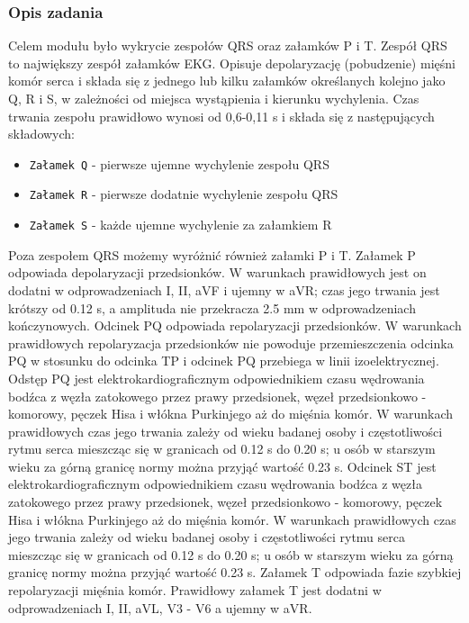 \documentclass[a4paper, 11pt]{article}
\begin{document}
\subsubsection{Opis zadania}
\label{sec:st_interval:desc}
Celem modułu było wykrycie zespołów QRS oraz załamków P i T.
Zespół QRS to największy zespół załamków EKG. Opisuje depolaryzację (pobudzenie) mięśni komór serca i składa się z jednego lub kilku załamków określanych kolejno jako Q, R i S, w zależności od miejsca wystąpienia i kierunku wychylenia. Czas trwania zespołu prawidłowo wynosi od 0,6-0,11 s i składa się z następujących składowych:
\begin{itemize}
     \item \verb|Załamek Q| - pierwsze ujemne wychylenie zespołu QRS
     \item \verb|Załamek R| - pierwsze dodatnie wychylenie zespołu QRS
     \item \verb|Załamek S| - każde ujemne wychylenie za załamkiem R
\end{itemize}

Poza zespołem QRS możemy wyróżnić również załamki P i T.
Załamek P odpowiada depolaryzacji przedsionków. W warunkach prawidłowych jest on dodatni w odprowadzeniach I, II, aVF i ujemny w aVR; czas jego trwania jest krótszy od 0.12 s, a amplituda nie przekracza 2.5 mm w odprowadzeniach kończynowych.
Odcinek PQ odpowiada repolaryzacji przedsionków. W warunkach prawidłowych repolaryzacja przedsionków nie powoduje przemieszczenia odcinka PQ w stosunku do odcinka TP i odcinek PQ przebiega w linii izoelektrycznej.
Odstęp PQ jest elektrokardiograficznym odpowiednikiem czasu wędrowania bodźca z węzła zatokowego
przez prawy przedsionek, węzeł przedsionkowo - komorowy, pęczek Hisa i włókna Purkinjego aż do mięśnia komór. W warunkach prawidłowych czas jego trwania zależy od wieku badanej osoby i częstotliwości rytmu serca mieszcząc się w granicach od 0.12 s do 0.20 s; u osób w starszym wieku za górną granicę normy można przyjąć wartość 0.23 s.
Odcinek ST jest elektrokardiograficznym odpowiednikiem czasu wędrowania bodźca z węzła zatokowego przez prawy przedsionek, węzeł przedsionkowo - komorowy, pęczek Hisa i włókna Purkinjego aż do mięśnia komór. W warunkach prawidłowych czas jego trwania zależy od wieku badanej osoby i częstotliwości rytmu serca mieszcząc się w granicach od 0.12 s do 0.20 s; u osób w starszym wieku za górną granicę normy można przyjąć wartość 0.23 s.
Załamek T odpowiada fazie szybkiej repolaryzacji mięśnia komór. Prawidłowy załamek T jest dodatni w odprowadzeniach I, II, aVL, V3 - V6 a ujemny w aVR.
\end{document}
